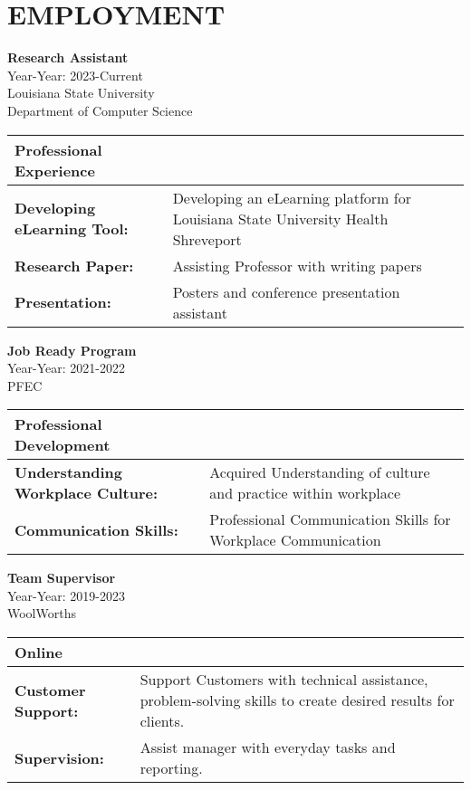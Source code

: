 \documentclass[a4paper,9pt]{article}
\begin{document}
\section*{EMPLOYMENT}
\noindent
\newline
\textbf{Research Assistant} \\
Year-Year: 2023-Current \\
Louisiana State University \\ 
Department of Computer Science \\
\begin{table}[h]
\centering
\begin{tabular}{|p{}|p{}|}
\hline
\textbf{Professional Experience} & \\
\hline
\textbf{Developing eLearning Tool:} & Developing an eLearning platform for Louisiana State University Health Shreveport \\
\hline
\textbf{Research Paper:} & Assisting Professor with writing papers \\
\hline
\textbf{Presentation:} & Posters and conference presentation assistant \\
\hline
\end{tabular}
\end{table}

\noindent
\textbf{Job Ready Program} \\
Year-Year: 2021-2022 \\
PFEC \\ 
\begin{table}[h]
\centering
\begin{tabular}{|p{}|p{}|}
\hline
\textbf{Professional Development} & \\
\hline
\textbf{Understanding Workplace Culture:} & Acquired Understanding of culture and practice within workplace \\
\hline
\textbf{Communication Skills:} & Professional Communication Skills for Workplace Communication \\
\hline
\end{tabular}
\end{table}

\textbf{Team Supervisor} \\
Year-Year: 2019-2023 \\
WoolWorths \\ 

\begin{table}[h]
\centering
\begin{tabular}{|p{}|p{}|}
\hline
\textbf{Online} & \\
\hline
\textbf{Customer Support:} & Support Customers with technical assistance, problem-solving skills to create desired results for clients. \\
\hline
\textbf{Supervision:} & Assist manager with everyday tasks and reporting. \\
\hline
\end{tabular}
\end{table}
\end{document}
